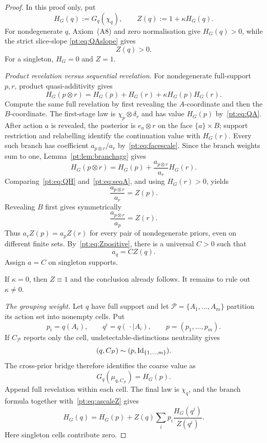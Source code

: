 \begin{proof}
In this proof only, put
\[
 H_G(q):=G_q(\chi_q),\qquad Z(q):=1+\kappa H_G(q).
\]
For nondegenerate $q$, Axiom~\textup{(A8)} and zero normalisation give
$H_G(q)>0$, while the strict slice-slope
\eqref{pt:eq:QAslope} gives
\begin{equation}
 Z(q)>0.
\label{pt:eq:Zpositive}
\end{equation}
For a singleton, $H_G=0$ and $Z=1$.

\emph{Product revelation versus sequential revelation.}
For nondegenerate full-support $p,r$, product quasi-additivity gives
\begin{equation}
 H_G(p\otimes r)
 =H_G(p)+H_G(r)+\kappa H_G(p)H_G(r).
\tag{QH}\label{pt:eq:QH}
\end{equation}
Compute the same full revelation by first revealing the $A$-coordinate and
then the $B$-coordinate.  The first-stage law is
$\chi_p\otimes\delta_r$ and has value $H_G(p)$ by~\eqref{pt:eq:QA}.
After action $a$ is revealed, the posterior is $e_a\otimes r$ on the face
$\{a\}\times B$; support restriction and relabelling identify the
continuation value with $H_G(r)$.  Every such branch has coefficient
$a_{p\otimes r}/a_r$ by~\eqref{pt:eq:facescale}.  Since the branch weights
sum to one, Lemma~\ref{pt:lem:branchagg} gives
\begin{equation}
 H_G(p\otimes r)=H_G(p)+\frac{a_{p\otimes r}}{a_r}H_G(r).
\tag{SA}\label{pt:eq:seqA}
\end{equation}
Comparing~\eqref{pt:eq:QH} and~\eqref{pt:eq:seqA}, and using
$H_G(r)>0$, yields
\[
 \frac{a_{p\otimes r}}{a_r}=Z(p).
\tag{R1}\label{pt:eq:ratio1}
\]
Revealing $B$ first gives symmetrically
\[
 \frac{a_{p\otimes r}}{a_p}=Z(r).
\tag{R2}\label{pt:eq:ratio2}
\]
Thus $a_rZ(p)=a_pZ(r)$ for every pair of nondegenerate priors, even on
different finite sets.  By~\eqref{pt:eq:Zpositive}, there is a universal
$C>0$ such that
\begin{equation}
 a_q=CZ(q).
\tag{AS}\label{pt:eq:ascaleZ}
\end{equation}
Assign $a=C$ on singleton supports.

If $\kappa=0$, then $Z\equiv1$ and the conclusion already follows.  It
remains to rule out $\kappa\ne0$.

\emph{The grouping weight.}
Let $q$ have full support and let
$\mathcal P=\{A_1,\ldots,A_m\}$ partition its action set into nonempty
cells.  Put
\[
 p_i=q(A_i),\qquad q^i=q(\,\cdot\mid A_i),\qquad
 p=(p_1,\ldots,p_m).
\]
If $C_{\mathcal P}$ reports only the cell, undetectable-distinctions
neutrality gives
\[
 (q,C_{\mathcal P})\sim(p,\operatorname{Id}_{\{1,\ldots,m\}}).
\]
The cross-prior bridge therefore identifies the coarse value as
\begin{equation}
 G_q(\mu_{q,C_{\mathcal P}})=H_G(p).
\tag{BG}\label{pt:eq:blockvalue}
\end{equation}
Append full revelation within each cell.  The final law is $\chi_q$, and the
branch formula together with~\eqref{pt:eq:ascaleZ} gives
\begin{equation}
 H_G(q)=H_G(p)+Z(q)\sum_i p_i\frac{H_G(q^i)}{Z(q^i)}.
\tag{GR}\label{pt:eq:groupingH}
\end{equation}
Here singleton cells contribute zero.


\end{proof}
